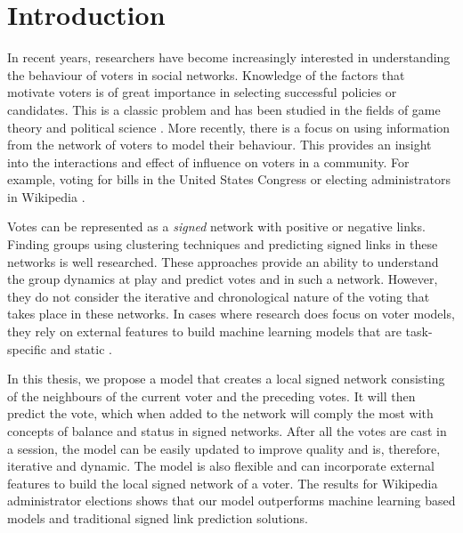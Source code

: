 \chapter{Introduction}



In recent years, researchers have become increasingly interested in understanding the behaviour of voters in social networks. Knowledge of the factors that motivate voters is of great importance in selecting successful policies or candidates. This is a classic problem and has been studied in the fields of game theory and political science \cite{zou2015strategicDoodle,kearns2009behavioral,tal2015a}. More recently, there is a focus on using information from the network of voters to model their behaviour. This provides an insight into the interactions and effect of influence on voters in a community. For example, voting for bills in the United States Congress \cite{karimi2019multicongress} or electing administrators in Wikipedia \cite{jankowski-lorek2013MBSN,cabunducan2011voting,lee2012uncovering}.

Votes can be represented as a \textit{signed} network with positive or negative links. Finding groups using clustering techniques \cite{brito2020aBrazil,levorato2016brazilian,chiang2014prediction} and predicting signed links \cite{leskovec2010predicting,leskovec2010signed,chiang2011exploiting} in these networks is well researched. These approaches provide an ability to understand the group dynamics at play and predict votes and in such a network. However, they do not consider the iterative and chronological nature of the voting that takes place in these networks. In cases where research does focus on voter models, they rely on external features to build machine learning models that are task-specific and static \cite{karimi2019multicongress,jankowski-lorek2013MBSN}.

In this thesis, we propose a model that creates a local signed network consisting of the neighbours of the current voter and the preceding votes. It will then predict the vote, which when added to the network will comply the most with concepts of balance and status in signed networks. After all the votes are cast in a session, the model can be easily updated to improve quality and is, therefore, iterative and dynamic. The model is also flexible and can incorporate external features to build the local signed network of a voter. The results for Wikipedia administrator elections shows that our model outperforms machine learning based models and traditional signed link prediction solutions. 

